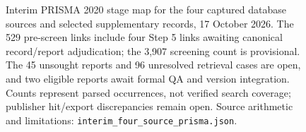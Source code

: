 \begin{figure}[p]
\caption{Interim PRISMA 2020 stage map for the four captured database sources and selected supplementary records, 17 October 2026. The 529 pre-screen links include four Step 5 links awaiting canonical record/report adjudication; the 3,907 screening count is provisional. The 45 unsought reports and 96 unresolved retrieval cases are open, and two eligible reports await formal QA and version integration. Counts represent parsed occurrences, not verified search coverage; publisher hit/export discrepancies remain open. Source arithmetic and limitations: \texttt{interim\_four\_source\_prisma.json}.}
\label{fig:prisma-interim-four-source}
\end{figure}
\clearpage
